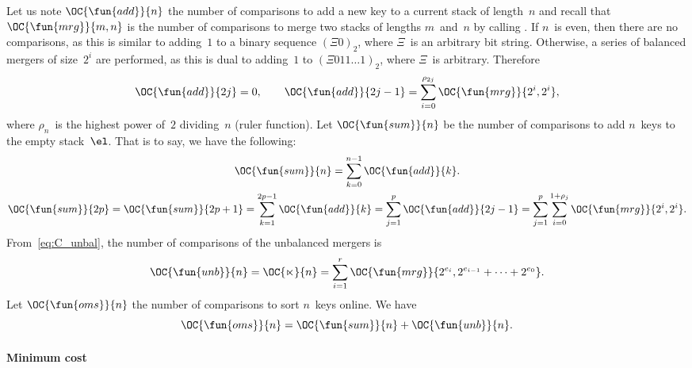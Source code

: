 Let us note \(\OC{\fun{add}}{n}\) the
number of comparisons to add a new key to a current stack of
length~\(n\) and recall that
\(\OC{\fun{mrg}}{m,n}\) is the number
of comparisons to merge two stacks of lengths \(m\)~and~\(n\) by
calling . If \(n\)~is even, then
there are no comparisons, as this is similar to adding~\(1\) to a
binary sequence \((\Xi{0})_2\), where \(\Xi\)~is an arbitrary bit
string. Otherwise, a series of balanced mergers of size~\(2^i\) are
performed, as this is dual to adding~\(1\) to \((\Xi{011}\ldots
1)_2\), where \(\Xi\)~is arbitrary. Therefore
\begin{equation*}
\OC{\fun{add}}{2j} = 0,\qquad
\OC{\fun{add}}{2j-1} = \sum_{i=0}^{\rho_{2j}}{\OC{\fun{mrg}}{2^i,2^i}},
\end{equation*}
where \(\rho_n\)~is the highest power of~\(2\) dividing~\(n\) (ruler
function).  Let
\(\OC{\fun{sum}}{n}\) be the number of
comparisons to add \(n\)~keys to the empty stack~\(\el\). That is to
say, we have the following:
\begin{gather}
\abovedisplayskip=0pt
\belowdisplayskip=0pt
\OC{\fun{sum}}{n} = \sum_{k=0}^{n-1}{\OC{\fun{add}}{k}}.\notag\\[0mm]
\OC{\fun{sum}}{2p} = \OC{\fun{sum}}{2p+1}
= \sum_{k=1}^{2p-1}{\OC{\fun{add}}{k}}
= \sum_{j=1}^{p}{\OC{\fun{add}}{2j-1}}
= \sum_{j=1}^{p}\sum_{i=0}^{1+\rho_{j}}{\OC{\fun{mrg}}{2^i,2^i}}.
\label{eq:sum_2p}
\end{gather}
From~\eqref{eq:C_unbal}, the number of comparisons of the
unbalanced mergers is
\begin{equation}
\abovedisplayskip=0pt
\belowdisplayskip=0pt
\OC{\fun{unb}}{n}
= \OC{\ltimes}{n}
= \sum_{i=1}^{r}{\OC{\fun{mrg}}{2^{e_i},2^{e_{i-1}}+\dots+2^{e_0}}}.
\index{unb@$\OC{\fun{unb}}{n}$}
\label{eq:cost_unb}
\end{equation}
Let \(\OC{\fun{oms}}{n}\) the number of
comparisons to sort \(n\)~keys online. We have
\begin{equation}
\OC{\fun{oms}}{n} = \OC{\fun{sum}}{n} + \OC{\fun{unb}}{n}.
\index{sum@$\OC{\fun{sum}}{n}$}
\label{eq:ocost_online}
\end{equation}

\paragraph{Minimum cost}


